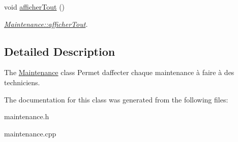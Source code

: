 \begin{DoxyCompactItemize}
\mbox{\label{class_maintenance_a68a453b1f48630a776c1f1b6605dd707}} 
void \hyperlink{class_maintenance_a68a453b1f48630a776c1f1b6605dd707}{afficher\+Tout} ()
\begin{DoxyCompactList}\small\item\em \hyperlink{class_maintenance_a68a453b1f48630a776c1f1b6605dd707}{Maintenance\+::afficher\+Tout}. \end{DoxyCompactList}\end{DoxyCompactItemize}


\subsection{Detailed Description}
The \hyperlink{class_maintenance}{Maintenance} class Permet d\textquotesingle{}affecter chaque maintenance à faire à des techniciens. 

The documentation for this class was generated from the following files\+:\begin{DoxyCompactItemize}
\item 
maintenance.\+h\item 
maintenance.\+cpp\end{DoxyCompactItemize}
